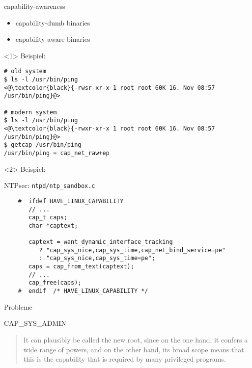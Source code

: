 \documentclass[usenames,dvipsnames,10pt]{beamer}
\begin{document}
\begin{frame}[fragile]{capability-awareness}
	\begin{itemize}[<+->]
	\item capability-dumb binaries
	\item capability-aware binaries
	\end{itemize}
	
	
	\begin{onlyenv}
	Beispiel: 
	
	\begin{lstlisting}[style=Bash]
# old system
$ ls -l /usr/bin/ping
<@\textcolor{black}{-rwsr-xr-x 1 root root 60K 16. Nov 08:57 /usr/bin/ping}@>

# modern system
$ ls -l /usr/bin/ping
<@\textcolor{black}{-rwxr-xr-x 1 root root 60K 16. Nov 08:57 /usr/bin/ping}@>
$ getcap /usr/bin/ping
/usr/bin/ping = cap_net_raw+ep
	\end{lstlisting}
	\end{onlyenv}
	
	\begin{onlyenv}
	Beispiel:
	
	\begin{listing}[H]
	\captionsetup{labelformat=empty}
	
	\caption{NTPsec: \texttt{ntpd/ntp\_sandbox.c}}
	\begin{verbatim}
	#  ifdef HAVE_LINUX_CAPABILITY
	   // ...
	   cap_t caps;
	   char *captext;
	
	   captext = want_dynamic_interface_tracking
	      ? "cap_sys_nice,cap_sys_time,cap_net_bind_service=pe"
	      : "cap_sys_nice,cap_sys_time=pe";
	   caps = cap_from_text(captext);
	   // ...
	   cap_free(caps);
	#  endif  /* HAVE_LINUX_CAPABILITY */
	\end{verbatim}
	\end{listing}
	
	\end{onlyenv}

\end{frame}

\begin{frame}{Probleme}
	\begin{block}{CAP\_SYS\_ADMIN}
	\begin{quote}
	It can plausibly be called \glqq the new root\grqq, since on the
	one hand, it confers a wide range of powers, and on the other hand, its broad
	scope means that this is the capability that is required by  many  privileged programs.
		\end{quote}
	\end{block}
\end{frame}
\end{document}
